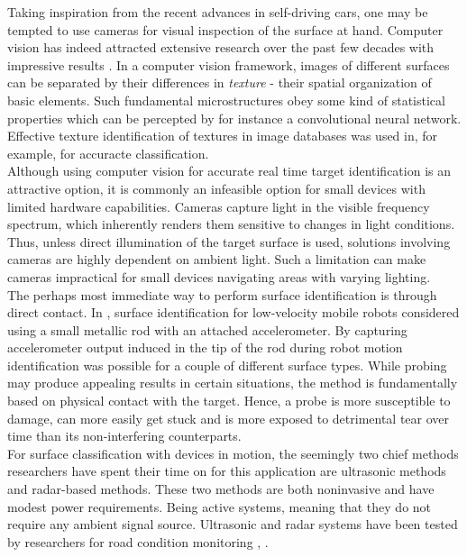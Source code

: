 Taking inspiration from the recent advances in self-driving cars, one may be tempted to use cameras for visual inspection of the surface at hand. Computer vision has indeed attracted extensive research over the past few decades with impressive results \citep{liu_chen_fieguth_zhao_chellappa_pietikäinen_2018}. In a computer vision framework, images of different surfaces can be separated by their differences in \emph{texture} - their spatial organization of basic elements. Such fundamental microstructures obey some kind of statistical properties which can be percepted by for instance a convolutional neural network. Effective texture identification of textures in image databases was used in, for example, \citep{do_vetterli_2002} for accuracte classification. \\
\indent Although using computer vision for accurate real time target identification is an attractive option, it is commonly an infeasible option for small devices with limited hardware capabilities. Cameras capture light in the visible frequency spectrum, which inherently renders them sensitive to changes in light conditions. Thus, unless direct illumination of the target surface is used, solutions involving cameras are highly dependent on ambient light. Such a limitation can make cameras impractical for small devices navigating areas with varying lighting. \\
\indent The perhaps most immediate way to perform surface identification is through direct contact. In \citep{giguere_dudek_2011}, surface identification for low-velocity mobile robots considered using a small metallic rod with an attached accelerometer. By capturing accelerometer output induced in the tip of the rod during robot motion identification was possible for a couple of different surface types. While probing may produce appealing results in certain situations, the method is fundamentally based on physical contact with the target. Hence, a probe is more susceptible to damage, can more easily get stuck and is more exposed to detrimental tear over time than its non-interfering counterparts. \\
\indent For surface classification with devices in motion, the seemingly two chief methods researchers have spent their time on for this application are ultrasonic methods and radar-based methods. These two methods are both noninvasive and have modest power requirements. Being active systems, meaning that they do not require any ambient signal source. Ultrasonic and radar systems have been tested by researchers for road condition monitoring \citep{bystrov_2016}, \citep{mckerrow_kristiansen_2006}. \\
